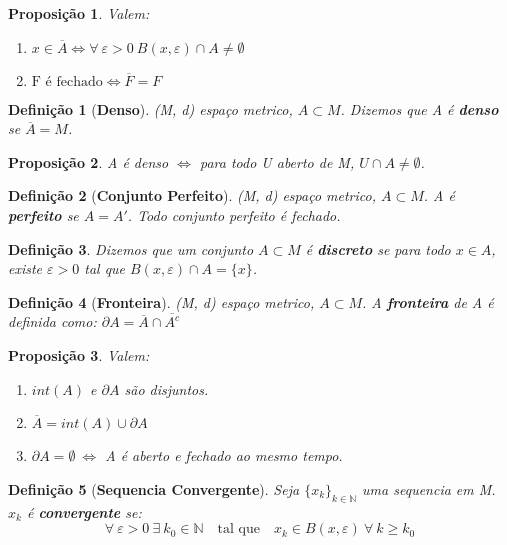 \documentclass{article}
\newtheorem*{definition}{Definição}
\newtheorem*{proposicao}{Proposição}
\begin{document}
\begin{proposicao} Valem:
    \begin{enumerate}
        \item  $x \in \overline{A} \Leftrightarrow \forall \: \varepsilon > 0 \: B(x, \varepsilon) \cap A \neq \emptyset$
        \item $ \text{F é fechado} \Leftrightarrow \overline{F} = F$
    \end{enumerate}
\end{proposicao}

\begin{definition}[\textbf{Denso}]
    (M, d) espaço metrico, $A \subset M$. Dizemos que A é \textbf{denso} se $\overline{A} = M$.
\end{definition}

\begin{proposicao}
    A é denso $\Leftrightarrow$ para todo U aberto de M, $U \cap A \neq \emptyset$.
\end{proposicao}

\begin{definition}[\textbf{Conjunto Perfeito}]
    (M, d) espaço metrico, $A \subset M$. A é \textbf{perfeito} se $A = A'$. Todo conjunto perfeito é fechado.
\end{definition}

\begin{definition}
    Dizemos que um conjunto $A \subset M$ é \textbf{discreto} se para todo $x \in A$, existe $\varepsilon > 0$ tal que $B(x, \varepsilon) \cap A = \{x\}$.
\end{definition}

\begin{definition}[\textbf{Fronteira}]
    (M, d) espaço metrico, $A \subset M$. A \textbf{fronteira} de A é definida como: $\partial A = \overline{A} \cap \overline{A^c} $
\end{definition}

\begin{proposicao}
    Valem:
    \begin{enumerate}
        \item $int(A)$ e $\partial A $ são disjuntos.
        \item $\overline{A} = int(A) \cup \partial A$
        \item $\partial A = \emptyset \: \Leftrightarrow$ A é aberto e fechado ao mesmo tempo.
    \end{enumerate}
\end{proposicao}

\begin{definition}[\textbf{Sequencia Convergente}]
    Seja $\{x_k\}_{k \in \mathbb{N}}$ uma sequencia em M. ${x_k}$ é \textbf{convergente} se:
    \[\forall \: \varepsilon > 0 \: \exists \: k_0 \in \mathbb{N} \quad \text{tal que} \quad x_k \in B(x, \varepsilon) \: \forall \: k \geq k_0\] 
\end{definition}
\end{document}
